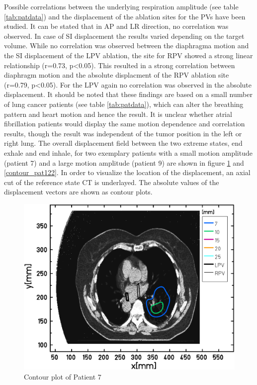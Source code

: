 \documentclass[type=dr, dr=rernat, accentcolor=tud7b,colorbacktitle, bigchapter, openright, twoside, 12pt ]{tudthesis}
\begin{document}
Possible correlations between the underlying respiration amplitude (see table \ref{tab:patdata}) and the displacement of the ablation sites 
for the PVs have been studied. It can be stated that in AP and LR direction, no correlation was observed. In case of SI displacement the 
results varied depending on the target volume. While no correlation was observed between the diaphragma motion and the SI displacement of the 
LPV ablation, the site for RPV showed a strong linear relationship (r=0.73, p<0.05). This resulted in a strong correlation between  
diaphragm motion and the absolute displacment of the RPV ablation site (r=0.79, p<0.05). For the LPV again no correlation was observed in the 
absolute displacement. \newline
\newline
It should be noted that these findings are based on a small number of lung cancer patients (see table \ref{tab:patdata}), which can alter the 
breathing pattern and heart motion and hence the result. It is unclear whether atrial fibrillation patients would display the same motion 
dependence and correlation results, though the result was independent of the tumor position in the left or right lung. 
\newpage
The overall displacement field between the two extreme states, end exhale and end inhale, for two exemplary patients with a small motion 
amplitude (patient 7) and a large motion amplitude (patient 9) are shown in figure \ref{contour_pat036} and \ref{contour_pat122}. In order to 
visualize the location of the displacement, an axial cut of the reference state CT is underlayed. The absolute values of the displacement 
vectors are shown as contour plots. 

\begin{figure}[H]
\begin{center}
 \includegraphics[scale=0.22]{Contour_z_abs_RESP_Pat037_HUSkala_gedreht.png}
\caption{Contour plot of Patient 7}
\label{contour_pat036}
\end{center}
\end{figure}
\end{document}
